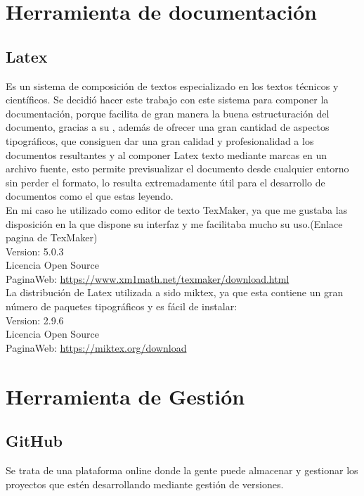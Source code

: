 \section{Herramienta de documentación}

\subsection{Latex}

Es un sistema de composición de textos especializado en los textos técnicos y científicos.
Se decidió hacer este trabajo con este sistema para componer la documentación, porque facilita de gran manera la buena estructuración del documento, gracias a su , además de ofrecer una gran cantidad de aspectos tipográficos, que consiguen dar una gran calidad y profesionalidad a los documentos resultantes y al componer Latex texto mediante marcas en un archivo fuente, esto permite previsualizar el documento desde cualquier entorno sin perder el formato, lo resulta extremadamente útil para el desarrollo de documentos como el que estas leyendo.\\

En mi caso he utilizado como editor de texto TexMaker, ya que me gustaba las disposición en la que dispone su interfaz y me facilitaba mucho su uso.(Enlace pagina de TexMaker)\\
Version: 5.0.3\\
Licencia Open Source\\
PaginaWeb: \url{https://www.xm1math.net/texmaker/download.html}\\

La distribución de Latex utilizada a sido miktex, ya que esta contiene un gran número de paquetes tipográficos y es fácil de instalar:\\
Version: 2.9.6\\
Licencia Open Source\\
PaginaWeb: \url{https://miktex.org/download}\\


\section{Herramienta de Gestión}

\subsection{GitHub}

Se trata de una plataforma online donde la gente puede almacenar y gestionar los proyectos que estén desarrollando mediante gestión de versiones.\\

